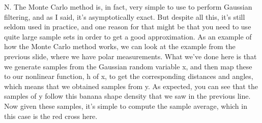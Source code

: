 N. The Monte Carlo method is, in fact,
very simple to use to perform Gaussian filtering,
and as I said, it's asymptotically exact.
But despite all this, it's still seldom used in practice,
and one reason for that might be that you
need to use quite large sample sets in order
to get a good approximation.
As an example of how the Monte Carlo method works,
we can look at the example from the previous slide, where
we have polar measurements.
What we've done here is that we generate samples
from the Gaussian random variable x,
and then map these to our nonlinear function,
h of x, to get the corresponding distances and angles,
which means that we obtained samples from y.
As expected, you can see that the samples of y
follow this banana shape density that we
saw in the previous line.
Now given these samples, it's simple to compute
the sample average, which in this case
is the red cross here.

